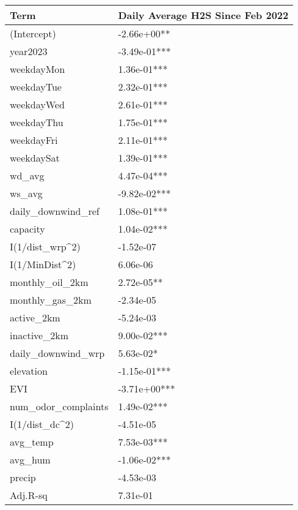 
\begin{tabular}{l|l}
\hline
Term & Daily Average H2S Since Feb 2022\\
\hline
(Intercept) & -2.66e+00**\\
\hline
year2023 & -3.49e-01***\\
\hline
weekdayMon & 1.36e-01***\\
\hline
weekdayTue & 2.32e-01***\\
\hline
weekdayWed & 2.61e-01***\\
\hline
weekdayThu & 1.75e-01***\\
\hline
weekdayFri & 2.11e-01***\\
\hline
weekdaySat & 1.39e-01***\\
\hline
wd\_avg & 4.47e-04***\\
\hline
ws\_avg & -9.82e-02***\\
\hline
daily\_downwind\_ref & 1.08e-01***\\
\hline
capacity & 1.04e-02***\\
\hline
I(1/dist\_wrp\textasciicircum{}2) & -1.52e-07\\
\hline
I(1/MinDist\textasciicircum{}2) & 6.06e-06\\
\hline
monthly\_oil\_2km & 2.72e-05**\\
\hline
monthly\_gas\_2km & -2.34e-05\\
\hline
active\_2km & -5.24e-03\\
\hline
inactive\_2km & 9.00e-02***\\
\hline
daily\_downwind\_wrp & 5.63e-02*\\
\hline
elevation & -1.15e-01***\\
\hline
EVI & -3.71e+00***\\
\hline
num\_odor\_complaints & 1.49e-02***\\
\hline
I(1/dist\_dc\textasciicircum{}2) & -4.51e-05\\
\hline
avg\_temp & 7.53e-03***\\
\hline
avg\_hum & -1.06e-02***\\
\hline
precip & -4.53e-03\\
\hline
Adj.R-sq & 7.31e-01\\
\hline
\end{tabular}
